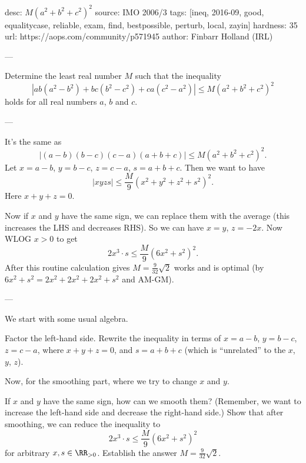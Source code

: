 desc: $M(a^2+b^2+c^2)^2$
source: IMO 2006/3
tags: [ineq, 2016-09, good, equalitycase, reliable, exam, find, bestpossible, perturb, local, zayin]
hardness: 35
url: https://aops.com/community/p571945
author: Finbarr Holland (IRL)

---

Determine the least real number $M$ such that the inequality
\[ \left\lvert ab(a^2-b^2)+bc(b^2-c^2)+ca(c^2-a^2) \right\rvert
  \leq M\left( a^2+b^2+c^2 \right)^2 \]
holds for all real numbers $a$, $b$ and $c$.

---

It's the same as
\[ \left\lvert (a-b)(b-c)(c-a)(a+b+c) \right\rvert
\le M \left( a^2+b^2+c^2 \right)^2. \]
Let $x=a-b$, $y=b-c$, $z=c-a$, $s=a+b+c$.
Then we want to have
\[
  \left\lvert xyzs \right\rvert
  \le \frac{M}{9} (x^2+y^2+z^2+s^2)^2.
\]
Here $x+y+z=0$.

Now if $x$ and $y$ have the same sign,
we can replace them with the average
(this increases the LHS and decreases RHS).
So we can have $x=y$, $z=-2x$.
Now WLOG $x > 0$ to get
\[ 2x^3 \cdot s \le \frac{M}{9} \left( 6x^2+s^2 \right)^2. \]
After this routine calculation gives
$M = \frac{9}{32}\sqrt2$ works and is optimal
(by $6x^2+s^2 = 2x^2 + 2x^2 + 2x^2 + s^2$ and AM-GM).

---

We start with some usual algebra.
\begin{walk}
  \ii Factor the left-hand side.
  \ii Rewrite the inequality in terms of $x=a-b$, $y=b-c$, $z=c-a$,
  where $x+y+z=0$, and $s = a+b+c$
  (which is ``unrelated'' to the $x$, $y$, $z$).
\end{walk}
Now, for the smoothing part, where we try to change $x$ and $y$.
\begin{walk}[resume]
  \ii If $x$ and $y$ have the same sign,
  how can we smooth them?
  (Remember, we want to increase the left-hand side
  and decrease the right-hand side.)
  \ii Show that after smoothing, we can reduce the inequality to
  \[ 2x^3 \cdot s \le \frac{M}{9} \left( 6x^2+s^2 \right)^2 \]
  for arbitrary $x,s \in \RR_{>0}$.
  \ii Establish the answer $M = \frac{9}{32}\sqrt2$.
\end{walk}
